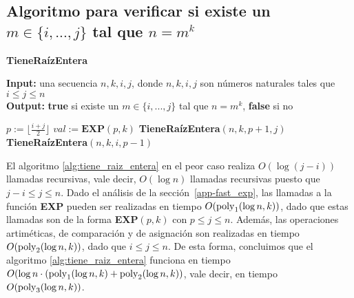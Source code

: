 \subsection{Algoritmo para verificar si existe un $m\in \{i,...,j\}$ tal que $n = m^k$}
\label{app-tiene_raiz_entera}
\begin{algorithm}[H]
\caption{\quad\textbf{TieneRaízEntera}}
\label{alg:tiene_raiz_entera}
\hspace*{\algorithmicindent} \textbf{Input:} una secuencia $n,k,i,j$, donde $n,k,i,j$ son números naturales  tales que $i \leq j \leq n$\\
\hspace*{\algorithmicindent} \textbf{Output:} \textbf{true} si existe un $m\in \{i,...,j\}$ tal que $n = m^k$, \textbf{false} si no 
\begin{algorithmic}[1]
   			\RETURN \TRUE
   		\ELSE
   			\RETURN \FALSE
   		\ENDIF
   		\STATE $p:=\lfloor \frac{i+j}{2}\rfloor$
   		\STATE $val:=\textbf{EXP}(p,k)$
   			\RETURN \TRUE
   			\RETURN \textbf{TieneRaízEntera}$(n,k,p+1,j)$
   		\ELSE
                        \RETURN \textbf{TieneRaízEntera}$(n,k,i,p-1)$
   		\ENDIF
        \ELSE
                \RETURN \FALSE
   	\ENDIF
\end{algorithmic}
\end{algorithm}
El algoritmo \ref{alg:tiene_raiz_entera} en el peor caso realiza  $O(\log (j - i))$ llamadas recursivas, vale decir, $O(\log n)$ llamadas recursivas puesto que $j - i \leq j \leq n$. 
Dado el análisis de la sección~\ref{app-fast_exp}, las llamadas a la función \textbf{EXP} pueden ser realizadas en tiempo $O({\rm poly}_1(\log n,k))$, dado que estas llamadas son de la forma \textbf{EXP}$(p,k)$ con $p \leq j \leq n$. Además, las operaciones artiméticas, de comparación y de asignación son realizadas en tiempo $O({\rm poly}_2(\log n, k))$, dado que $i \leq j \leq n$. 
De esta forma, concluimos que el algoritmo \ref{alg:tiene_raiz_entera} funciona en tiempo
$O(\log n \cdot ({\rm poly}_1(\log n,k) + {\rm poly}_2(\log n, k))$, vale decir, en tiempo $O({\rm poly}_3(\log n, k))$.


